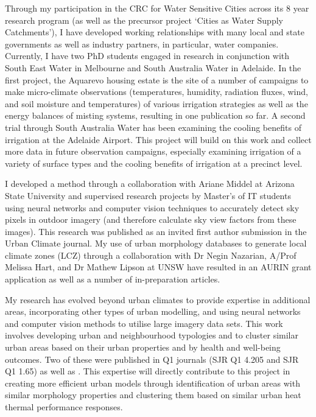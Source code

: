 Through my participation in the CRC for Water Sensitive Cities across its 8 year research program (as well as the precursor project `Cities as Water Supply Catchments'), I have developed working relationships with many local and state governments as well as industry partners, in particular, water companies. Currently, I have two PhD students engaged in research in conjunction with South East Water in Melbourne and South Australia Water in Adelaide. In the first project, the Aquarevo housing estate\cite{SEW2020} is the site of a number of campaigns to make micro-climate observations (temperatures, humidity, radiation fluxes, wind, and soil moisture and temperatures) of various irrigation strategies as well as the energy balances of misting systems, resulting in one publication \cite{Cheung2021} so far. A second trial through South Australia Water has been examining the cooling benefits of irrigation at the Adelaide Airport\cite{CRCWCS2018,Ingleton2020,Qian2020}. This project will build on this work and collect more data in future observation campaigns, especially examining irrigation of a variety of surface types and the cooling benefits of irrigation at a precinct level.

I developed a method through a collaboration with Ariane Middel at Arizona State University and supervised research projects by Master's of IT students using neural networks and computer vision techniques to accurately detect sky pixels in outdoor imagery (and therefore calculate sky view factors from these images). This research was published as an invited first author submission\cite{Nice2020} in the Urban Climate journal. My use of urban morphology databases to generate local climate zones (LCZ) through a collaboration with Dr Negin Nazarian, A/Prof Melissa Hart, and Dr Mathew Lipson at UNSW have resulted in an AURIN grant application as well as a number of in-preparation articles.

My research has evolved beyond urban climates to provide expertise in additional areas, incorporating other types of urban modelling, and using neural networks and computer vision methods to utilise large imagery data sets. This work involves developing urban and neighbourhood typologies and to cluster similar urban areas based on their urban properties and by health and well-being outcomes. Two of these were published in Q1 journals\cite{Thompson2020,Wijnands2019} (SJR Q1 4.205 and SJR Q1 1.65) as well as \cite{Nice2020a}. This expertise will directly contribute to this project in creating more efficient urban models through identification of urban areas with similar morphology properties and clustering them based on similar urban heat thermal performance responses.

